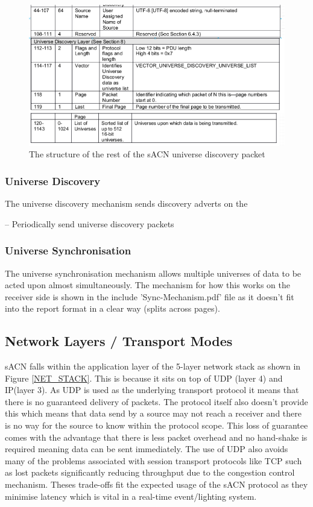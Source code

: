 \documentclass[11pt,a4paper]{report}
\begin{document}
\begin{figure}[H]
\label{ACN_REST_DISCOVERY_PACKET}
\includegraphics[width=\textwidth]{acn_discovery_packet_specific_structure}
\caption{The structure of the rest of the sACN universe discovery packet}
\end{figure}

\subsubsection{Universe Discovery}
The universe discovery mechanism sends discovery adverts on the 

-- Periodically send universe discovery packets

\subsubsection{Universe Synchronisation}
The universe synchronisation mechanism allows multiple universes of data to be acted upon almost simultaneously. The mechanism for how this works on the receiver side is shown in the include 'Sync-Mechanism.pdf' file as it doesn't fit into the report format in a clear way (splits across pages).

\subsection{Network Layers / Transport Modes}
sACN falls within the application layer of the 5-layer network stack as shown in Figure \ref{NET_STACK}. This is because it sits on top of UDP (layer 4) and IP(layer 3). As UDP is used as the underlying transport protocol it means that there is no guaranteed delivery of packets. The protocol itself also doesn't provide this which means that data send by a source may not reach a receiver and there is no way for the source to know within the protocol scope. This loss of guarantee comes with the advantage that there is less packet overhead and no hand-shake is required meaning data can be sent immediately. The use of UDP also avoids many of the problems associated with session transport protocols like TCP such as lost packets significantly reducing throughput due to the congestion control mechanism. Theses trade-offs fit the expected usage of the sACN protocol as they minimise latency which is vital in a real-time event/lighting system. \\
\end{document}
